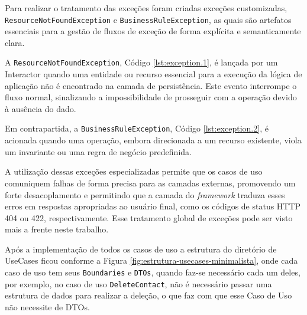     

    \par Para realizar o tratamento das exceções foram criadas exceções customizadas,  \texttt{ResourceNotFoundException} e \texttt{BusinessRuleException}, as quais são artefatos essenciais para a gestão de fluxos de exceção de forma explícita e semanticamente clara. 
    
    \par A \texttt{ResourceNotFoundException}, Código \ref{lst:exception.1}, é lançada por um Interactor quando uma entidade ou recurso essencial para a execução da lógica de aplicação não é encontrado na camada de persistência. Este evento interrompe o fluxo normal, sinalizando a impossibilidade de prosseguir com a operação devido à ausência do dado. 
    
    
    
    \par Em contrapartida, a \texttt{BusinessRuleException}, Código \ref{lst:exception.2}, é acionada quando uma operação, embora direcionada a um recurso existente, viola um invariante ou uma regra de negócio predefinida.

    
    
    \par A utilização dessas exceções especializadas permite que os casos de uso comuniquem falhas de forma precisa para as camadas externas, promovendo um forte desacoplamento e permitindo que a camada do \textit{framework} traduza esses erros em respostas apropriadas ao usuário final, como os códigos de status HTTP 404 ou 422, respectivamente. Esse tratamento global de exceções pode ser visto mais a frente neste trabalho.

    
    \par Após a implementação de todos os casos de uso a estrutura do diretório de UseCases ficou conforme a Figura \ref{fig:estrutura-usecases-minimalista}, onde cada caso de uso tem seus \texttt{Boundaries} e \texttt{DTOs}, quando faz-se necessário cada um deles, por exemplo, no caso de uso \texttt{DeleteContact}, não é necessário passar uma estrutura de dados para realizar a deleção, o que faz com que esse Caso de Uso não necessite de DTOs.
    
